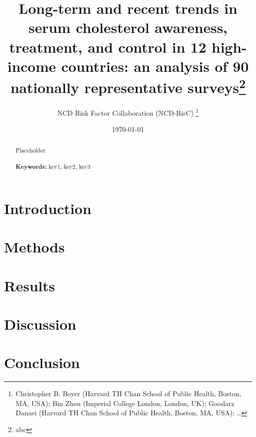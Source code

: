 \documentclass[12pt]{article}
\begin{document}
\begin{titlepage}
\title{Long-term and recent trends in serum cholesterol awareness, treatment, and control in 12 high-income countries: an analysis of 90 nationally representative surveys\thanks{abc}}
\author{NCD Risk Factor Collaboration (NCD-RisC) 
    \thanks{Christopher B. Boyer (Harvard TH Chan School of Public Health, Boston, MA, USA); Bin Zhou (Imperial College London, London, UK); Goodarz Danaei (Harvard TH Chan School of Public Health, Boston, MA, USA); \ldots}}
\date{\today}
\maketitle
\begin{abstract}
\noindent Placeholder\\
\vspace{0in}\\
\noindent\textbf{Keywords:} key1, key2, key3\\

\bigskip
\end{abstract}
\setcounter{page}{0}
\thispagestyle{empty}
\end{titlepage}
\pagebreak \newpage




\doublespacing


\section{Introduction} \label{sec:introduction}

\section{Methods} \label{sec:methods}

\section{Results} \label{sec:result}

\section{Discussion} \label{sec:discussion}

\section{Conclusion} \label{sec:conclusion}
\end{document}
